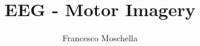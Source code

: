 \documentclass{unicam_thesis}
\title{EEG - Motor Imagery}
\subtitle{}
\author{Francesco Moschella}%
\begin{document}
\maketitle

\tableofcontents
\lstlistoflistings
\listoffigures
\listoftables









\appendix

\printbibliography
%
\end{document}
